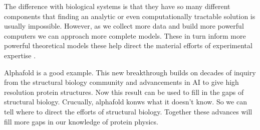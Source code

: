 The difference with biological systems is that they have so many different components that finding an analytic or even computationally tractable solution is usually impossible. However, as we collect more data and build more powerful computers we can approach more complete models. These in turn inform more powerful theoretical models these help direct the material efforts of experimental expertise . 

Alphafold is a good example. This new breakthrough builds on decades of inquiry from the structural biology community and advancements in AI to give high resolution protein structures. Now this result can be used to fill in the gaps of structural biology. Crucually, alphafold konws what it doesn't know. So we can tell where to direct the efforts of structural biology. Together these advances will fill more gaps in our knowledge of protein physics. 
